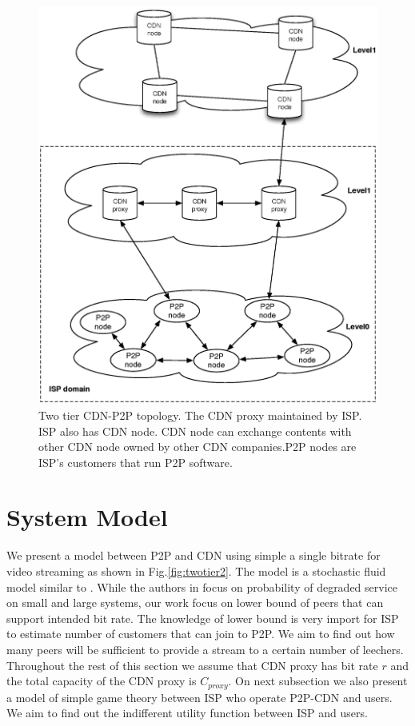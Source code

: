 \documentclass[paper]{ieice}
\begin{document}
\begin{figure}[tb]
\begin{center}
\includegraphics[scale=0.35]{graphs/two-tier-cdn-topology.eps}
\end{center}
\caption{Two tier CDN-P2P topology.
The CDN proxy maintained by ISP. ISP also has CDN node. CDN node can exchange contents with other CDN node owned by other CDN companies.P2P nodes are ISP's customers that run P2P software.}
\label{fig:twotier}
\vspace{-2mm}
\end{figure} 
  
\section{System Model}\label{systemmodel}
We present a model between P2P and CDN using simple a single bitrate for video streaming as shown in Fig.\ref{fig:twotier2}. 
The model is a stochastic fluid model similar to \cite{4215694}.
While the authors in \cite{4215694} focus on probability of degraded service on small and large systems, our work focus on lower bound of peers that can support intended bit rate.
The knowledge of lower bound is very import for ISP to estimate number of customers that can join to P2P.
We aim to find out how many peers will be sufficient to provide a stream to a certain number of leechers.
Throughout the rest of this section we assume that CDN proxy has bit rate $r$  and the total capacity of the CDN proxy is $C_{proxy}$.
On next subsection we also present a model of simple game theory between ISP who operate P2P-CDN and users.
We aim to find out the indifferent utility function between ISP and users.
\end{document}
